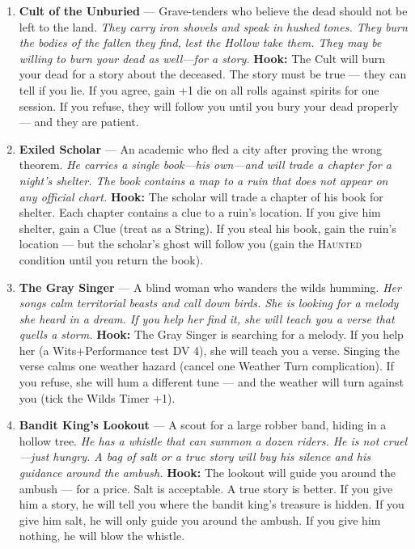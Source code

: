 \begin{enumerate}
\item \textbf{Cult of the Unburied} --- Grave-tenders who believe the dead should not be left to the land.
  \hfill \textit{They carry iron shovels and speak in hushed tones. They burn the bodies of the fallen they find, lest the Hollow take them. They may be willing to burn your dead as well---for a story.}
  \textbf{Hook:} The Cult will burn your dead for a story about the deceased. The story must be true --- they can tell if you lie. If you agree, gain +1 die on all rolls against spirits for one session. If you refuse, they will follow you until you bury your dead properly --- and they are patient.
  
\item[J] \textbf{Exiled Scholar} --- An academic who fled a city after proving the wrong theorem.
  \hfill \textit{He carries a single book---his own---and will trade a chapter for a night's shelter. The book contains a map to a ruin that does not appear on any official chart.}
  \textbf{Hook:} The scholar will trade a chapter of his book for shelter. Each chapter contains a clue to a ruin's location. If you give him shelter, gain a Clue (treat as a String). If you steal his book, gain the ruin's location --- but the scholar's ghost will follow you (gain the \textsc{Haunted} condition until you return the book).
  
\item[Q] \textbf{The Gray Singer} --- A blind woman who wanders the wilds humming.
  \hfill \textit{Her songs calm territorial beasts and call down birds. She is looking for a melody she heard in a dream. If you help her find it, she will teach you a verse that quells a storm.}
  \textbf{Hook:} The Gray Singer is searching for a melody. If you help her (a Wits+Performance test DV 4), she will teach you a verse. Singing the verse calms one weather hazard (cancel one Weather Turn complication). If you refuse, she will hum a different tune --- and the weather will turn against you (tick the Wilds Timer +1).
  
\item[K] \textbf{Bandit King's Lookout} --- A scout for a large robber band, hiding in a hollow tree.
  \hfill \textit{He has a whistle that can summon a dozen riders. He is not cruel---just hungry. A bag of salt or a true story will buy his silence and his guidance around the ambush.}
  \textbf{Hook:} The lookout will guide you around the ambush --- for a price. Salt is acceptable. A true story is better. If you give him a story, he will tell you where the bandit king's treasure is hidden. If you give him salt, he will only guide you around the ambush. If you give him nothing, he will blow the whistle.
  

\end{enumerate}
